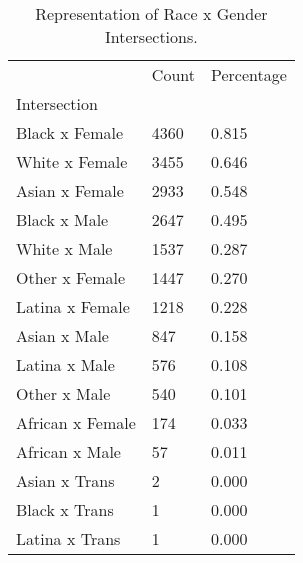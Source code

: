 \begin{table}[htbp]
\centering
\caption{Representation of Race x Gender Intersections.}
\label{tab:intersections}
\begin{tabular}{lll}
\toprule
 & Count & Percentage \\
Intersection &  &  \\
\midrule
Black x Female & 4360 & 0.815 \\
White x Female & 3455 & 0.646 \\
Asian x Female & 2933 & 0.548 \\
Black x Male & 2647 & 0.495 \\
White x Male & 1537 & 0.287 \\
Other x Female & 1447 & 0.270 \\
Latina x Female & 1218 & 0.228 \\
Asian x Male & 847 & 0.158 \\
Latina x Male & 576 & 0.108 \\
Other x Male & 540 & 0.101 \\
African x Female & 174 & 0.033 \\
African x Male & 57 & 0.011 \\
Asian x Trans & 2 & 0.000 \\
Black x Trans & 1 & 0.000 \\
Latina x Trans & 1 & 0.000 \\
\bottomrule
\end{tabular}

\end{table}
